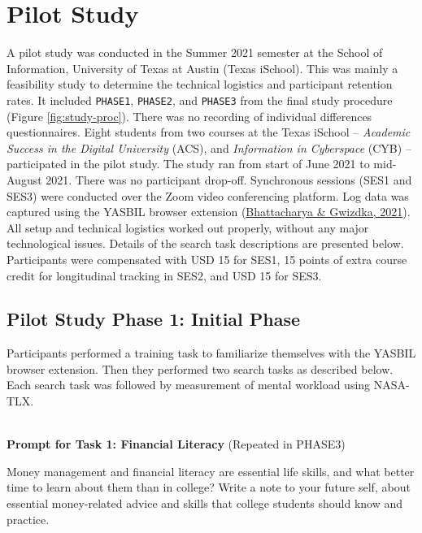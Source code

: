 \documentclass[letterpaper, nobind]{templates/ociamthesis}
\begin{document}
\hypertarget{app-pilot-study}{%
\chapter{Pilot Study}\label{app-pilot-study}}

A pilot study was conducted in the Summer 2021 semester at the School of
Information, University of Texas at Austin (Texas iSchool). This was
mainly a feasibility study to determine the technical logistics and
participant retention rates. It included \texttt{PHASE1}, \texttt{PHASE2}, and \texttt{PHASE3} from the final study procedure (Figure \ref{fig:study-proc}). There was no recording of individual
differences questionnaires. Eight students from two courses
at the Texas iSchool -- \emph{Academic Success in the Digital University}
(ACS), and \emph{Information in Cyberspace} (CYB) -- participated in the
pilot study. The study ran from start of June 2021 to mid-August 2021.
There was no participant drop-off. Synchronous sessions (SES1 and SES3)
were conducted over the Zoom video conferencing platform. Log data was
captured using the YASBIL browser extension (\protect\hyperlink{ref-bhattacharya2021yasbil}{Bhattacharya \& Gwizdka, 2021}).
All setup and technical logistics worked out properly, without any major
technological issues. Details of the search task descriptions are
presented below. Participants were compensated with USD 15 for SES1, 15
points of extra course credit for longitudinal tracking in SES2, and USD
15 for SES3.

\hypertarget{pilot-study-phase-1-initial-phase}{%
\section{Pilot Study Phase 1: Initial Phase}\label{pilot-study-phase-1-initial-phase}}

Participants performed a training task to familiarize themselves with
the YASBIL browser extension. Then they performed two search tasks as
described below. Each search task was followed by measurement of mental
workload using NASA-TLX.

~\\
\textbf{Prompt for Task 1: Financial Literacy} (Repeated in PHASE3)

Money management and financial literacy are essential life skills, and
what better time to learn about them than in college? Write a note to
your future self, about essential money-related advice and skills that
college students should know and practice.
\end{document}
